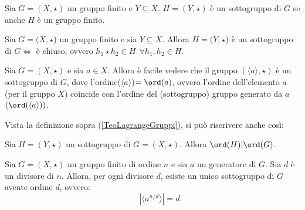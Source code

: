 \begin{definition}[Sottogruppo]
    Sia $G=(X,\star)$ un gruppo finito e $Y \subseteq X$. $H=(Y,\star)$ è un sottogruppo di $G$ se anche $H$ è un gruppo finito. 
\end{definition} 

\begin{theorem}
    Sia $G=(X,\star$) un gruppo finito e sia $Y \subseteq X$. Allora $H=(Y,\star$) è un sottogruppo di $G \iff$ è chiuso, ovvero $h_1 \star h_2 \in H \ \ \forall h_1, h_2 \in H$.  
\end{theorem} 

\begin{definition}
    Sia $G=(X,\star)$ e sia $a \in X$. Allora è facile vedere che il gruppo $(\langle a\rangle, \star)$ è un sottogruppo di $G$, dove l'ordine($\langle a\rangle$)$=\ord(a)$, ovvero l'ordine dell'elemento $a$ (per il gruppo $X$) coincide con l'ordine del (sottogruppo) gruppo generato da $a$ $(\ord(\langle a \rangle))$.
\end{definition}

Vista la definizione sopra (\ref{TeoLagrangeGruppi}), si può riscrivere anche così:
\begin{theorem}
    Sia $H=(Y,\star)$ un sottogruppo di $G=(X,\star)$. Allora $\ord(H)|\ord(G)$. 
\end{theorem}

\begin{theorem} 
    Sia $G=(X,\star)$ un gruppo finito di ordine $n$ e sia $a$ un generatore di $G$. Sia $d$ è un divisore di $n$. Allora, per ogni divisore $d$, esiste un unico sottogruppo di $G$ avente ordine $d$, ovvero:
    \[
    \qquad |\langle a^{n/d} \rangle| = d.
\]
\end{theorem}




